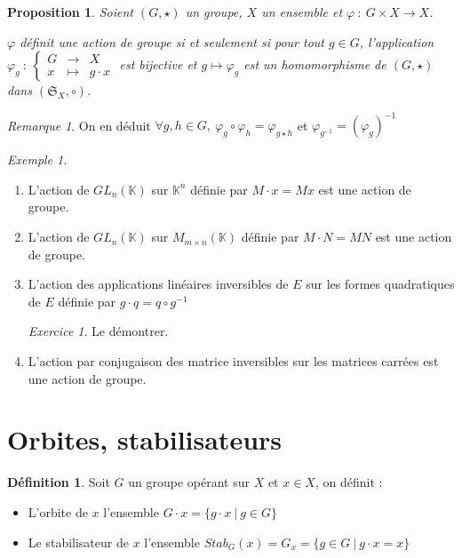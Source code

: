 \documentclass[]{article}
\newtheorem{myproposition}{Proposition}
\theoremstyle{remark}
\newtheorem{myrem}{Remarque}
\newtheorem{myexer}{Exercice}
\newtheorem{myexmpl}{Exemple}
\theoremstyle{definition}
\newtheorem{mydef}{Définition}
\newcommand{\func}[5]{
#1 ~ : ~ \left\{ \begin{array}{lcl}
	#2 & \longrightarrow & #3 \\
	#4 & \longmapsto & #5
\end{array}
\right.
}
\newcommand{\funcshort}[3]{
#1 ~ : ~ #2 \longrightarrow #3
}
\begin{document}
\begin{myproposition}
	Soient $(G, \star)$ un groupe, $X$ un ensemble et $\funcshort{\varphi}{G \times X}{X}$.
	
	$\varphi$ définit une action de groupe si et seulement si pour tout $g \in G$, l'application $\func{\varphi_g}{G}{X}{x}{g \cdot x}$ est bijective et $g\longmapsto \varphi_g$ est un homomorphisme de $(G, \star)$ dans $(\mathfrak{S}_X, \circ)$.
\end{myproposition}

\begin{myrem}
	On en déduit $\forall g, h \in G, ~ \varphi_g \circ \varphi_h = \varphi_{g \star h}$ et $\varphi_{g^{-1}}=(\varphi_g)^{-1}$
\end{myrem}

\begin{myexmpl}
	\begin{enumerate}
		\item L'action de $GL_n(\mathbb{K})$ sur $\mathbb{K}^n$ définie par $M\cdot x=Mx$ est une action de groupe.
	
		\item L'action de $GL_n(\mathbb{K})$ sur $M_{m \times n}(\mathbb{K})$ définie par $M \cdot N=MN$ est une action de groupe.
				
		\item L'action des applications linéaires inversibles de $E$ sur les formes quadratiques de $E$ définie par $g \cdot q = q \circ g^{-1}$
		
		\begin{myexer}
			Le démontrer.
		\end{myexer}
		
		\item L'action par conjugaison des matrice inversibles sur les matrices carrées est une action de groupe.
	\end{enumerate}
\end{myexmpl}

\section{Orbites, stabilisateurs}

\begin{mydef}
	Soit $G$ un groupe opérant sur $X$ et $x \in X$, on définit :
	
	\begin{itemize}
		\item L'orbite de $x$ l'ensemble $G \cdot x=\{g\cdot x ~ | ~ g \in G\}$
		
		\item Le stabilisateur de $x$ l'ensemble $Stab_G(x)=G_x = \{g \in G ~ | ~ g \cdot x = x\}$
	\end{itemize}
\end{mydef}
\end{document}
